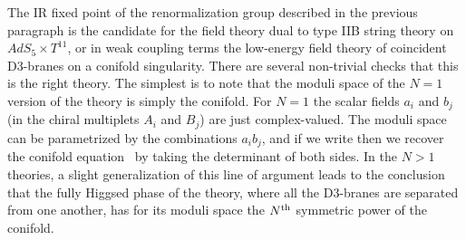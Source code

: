 The IR fixed point of the renormalization group 
described in the previous paragraph is the
candidate for the field theory dual to type IIB string theory on
$AdS_5 \times T^{11}$, or in
weak coupling terms the low-energy field theory of coincident
D3-branes on a conifold singularity.  There are several non-trivial
checks that this is the right theory.  The simplest is to note that
the moduli space of the $N=1$ version of the theory is simply the
conifold.  For $N=1$ the scalar fields $a_i$ and $b_j$ (in the chiral
multiplets $A_i$ and $B_j$) are just
complex-valued.  The moduli space 
can
be parametrized by the
combinations $a_i b_j$, and if we write
 then we recover the conifold equation \ConEq\ by taking the
determinant of both sides.  In the $N>1$ theories, a slight
generalization of this line of argument leads to the conclusion that
the fully Higgsed phase of the theory, where all the D3-branes are
separated from one another, has for its moduli space the $N^{\rm th}$
symmetric power of the conifold.

